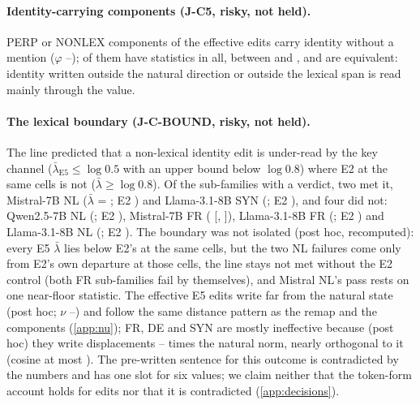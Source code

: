 \paragraph{Identity-carrying components (J-C5, risky, not held).} \JcFiveCarriers{} PERP or NONLEX components of the effective edits carry identity without a mention ($\varphi$ \JcFivePhiMin{}--\JcFivePhiMax{}); \JcFiveCarriersStat{} of them have \JcFiveNstat{} statistics in all, between \JcFiveLamMin{} and \JcFiveLamMax{}, and \JcFiveNeq{} are equivalent: identity written outside the natural direction or outside the lexical span is read mainly through the value.

\paragraph{The lexical boundary (J-C-BOUND, risky, not held).} The line predicted that a non-lexical identity edit is under-read by the key channel ($\bar\lambda_{\mathrm{E5}} \leq \log 0.5$ with an upper bound below $\log 0.8$) where E2 at the same cells is not ($\bar\lambda \geq \log 0.8$). Of the \JcBoundVerd{} sub-families with a verdict, two met it, Mistral-7B NL ($\bar\lambda$ = \JcBoundNlMistralSeven{}; E2 \JcBoundEtwoNlMistralSeven{}) and Llama-3.1-8B SYN (\JcBoundSynLlamaEight{}; E2 \JcBoundEtwoSynLlamaEight{}), and four did not: Qwen2.5-7B NL (\JcBoundNlQwenSeven{}; E2 \JcBoundEtwoNlQwenSeven{}), Mistral-7B FR (\JcBoundFrMistralSeven{} [\JcBoundFrMistralSevenLo{}, \JcBoundFrMistralSevenHi{}]), Llama-3.1-8B FR (\JcBoundFrLlamaEight{}; E2 \JcBoundEtwoFrLlamaEight{}) and Llama-3.1-8B NL (\JcBoundNlLlamaEight{}; E2 \JcBoundEtwoNlLlamaEight{}). The boundary was not isolated (post hoc, recomputed): every E5 $\bar\lambda$ lies below E2's at the same cells, but the two NL failures come only from E2's own departure at those cells, the line stays not met without the E2 control (both FR sub-families fail by themselves), and Mistral NL's pass rests on one near-floor statistic. The effective E5 edits write far from the natural state (post hoc; $\nu$ \JcBoundNuMin{}--\JcBoundNuMax{}) and follow the same distance pattern as the remap and the components (\cref{app:nu}); FR, DE and SYN are mostly ineffective because (post hoc) they write displacements \JcBoundFrDeSynNormMin{}--\JcBoundFrDeSynNormMax{} times the natural norm, nearly orthogonal to it (cosine at most \JcBoundFrDeSynCosMax{}). The pre-written sentence for this outcome is contradicted by the numbers and has one slot for six values; we claim neither that the token-form account holds for edits nor that it is contradicted (\cref{app:decisions}). %

